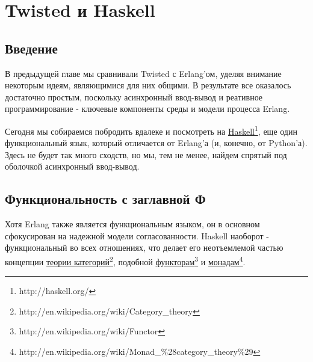 
\section{Twisted и Haskell\label{sec:part21}}

\subsection{Введение}

В предыдущей главе мы сравнивали Twisted с Erlang'ом, 
уделяя внимание некоторым идеям, являющимися для них общими. 
В результате все оказалось достаточно простым, поскольку 
асинхронный ввод-вывод и реативное программирование - 
ключевые компоненты среды и модели процесса Erlang.


Сегодня мы собираемся побродить вдалеке и посмотреть на 
\href{http://haskell.org/}{Haskell}\footnote[1]{http://haskell.org/}, 
еще один функциональный язык, который отличается от Erlang'а (и, конечно, от Python'а). 
Здесь не будет так много сходств, но мы, тем не менее, найдем 
спрятый под оболочкой асинхронный ввод-вывод. 


\subsection{Функциональность с заглавной Ф}

Хотя Erlang также является функциональным языком, он в основном 
сфокусирован на надежной модели согласованности. Haskell наоборот - 
функциональный во всех отношениях, что делает его неотъемлемой 
частью концепции \href{http://en.wikipedia.org/wiki/Category\_theory}{теории категорий}\footnote[2]{http://en.wikipedia.org/wiki/Category\_theory},  
подобной \href{http://en.wikipedia.org/wiki/Functor}{функторам}\footnote[3]{http://en.wikipedia.org/wiki/Functor} 
и \href{http://en.wikipedia.org/wiki/Monad\_\%28category\_theory\%29}{монадам}\footnote[4]{http://en.wikipedia.org/wiki/Monad\_\%28category\_theory\%29}.


